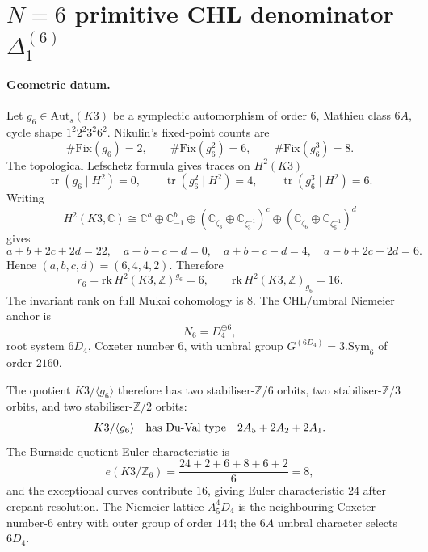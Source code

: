 \providecommand{\C}{\mathbb{C}}
\providecommand{\Z}{\mathbb{Z}}
\providecommand{\Q}{\mathbb{Q}}
\providecommand{\Sp}{\mathrm{Sp}}
\providecommand{\SO}{\mathrm{SO}}
\providecommand{\Auts}{\mathrm{Aut}_{s}}
\providecommand{\Fix}{\mathrm{Fix}}
\providecommand{\fg}{\mathfrak{g}}
\providecommand{\Bor}{\mathrm{Bor}}
\providecommand{\Grit}{\mathrm{Grit}}
\providecommand{\kch}{\kappa_{\mathrm{ch}}}
\providecommand{\kBKM}{\kappa_{\mathrm{BKM}}}
\providecommand{\kcat}{\kappa_{\mathrm{cat}}}
\providecommand{\kfib}{\kappa_{\mathrm{fiber}}}
\providecommand{\phiZO}{\phi_{0,1}}
\providecommand{\GammaSix}{\Gamma_{6}^{+}}
\providecommand{\DeltaOneSix}{\Delta_{1}^{(6)}}
\providecommand{\gSix}{\fg_{\DeltaOneSix}}

\section*{$N=6$ primitive CHL denominator $\DeltaOneSix$}
\label{sec:N6-primitive-chl-denominator}

\paragraph{Geometric datum.}
Let $g_6\in\Auts(K3)$ be a symplectic automorphism of order $6$, Mathieu
class $6A$, cycle shape $1^2 2^2 3^2 6^2$. Nikulin's fixed-point counts
are
\[
  \#\Fix(g_6)=2,\qquad
  \#\Fix(g_6^2)=6,\qquad
  \#\Fix(g_6^3)=8 .
\]
The topological Lefschetz formula gives traces on $H^2(K3)$
\[
  \operatorname{tr}(g_6\mid H^2)=0,\qquad
  \operatorname{tr}(g_6^2\mid H^2)=4,\qquad
  \operatorname{tr}(g_6^3\mid H^2)=6 .
\]
Writing
\[
  H^2(K3,\C)\cong
  \C^{a}\oplus\C_{-1}^{b}
  \oplus(\C_{\zeta_3}\oplus\C_{\zeta_3^{-1}})^c
  \oplus(\C_{\zeta_6}\oplus\C_{\zeta_6^{-1}})^d
\]
gives
\[
  a+b+2c+2d=22,\quad a-b-c+d=0,\quad
  a+b-c-d=4,\quad a-b+2c-2d=6 .
\]
Hence $(a,b,c,d)=(6,4,4,2)$. Therefore
\[
  r_6=\mathrm{rk}\,H^2(K3,\Z)^{g_6}=6,
  \qquad
  \mathrm{rk}\,H^2(K3,\Z)_{g_6}=16 .
\]
The invariant rank on full Mukai cohomology is $8$.
The CHL/umbral Niemeier anchor is
\[
  N_6=D_4^{\oplus6},
\]
root system $6D_4$, Coxeter number $6$, with umbral group
$G^{(6D_4)}=3.\mathrm{Sym}_6$ of order $2160$.

The quotient $K3/\langle g_6\rangle$ therefore has two stabiliser-$\Z/6$
orbits, two stabiliser-$\Z/3$ orbits, and two stabiliser-$\Z/2$ orbits:
\[
  K3/\langle g_6\rangle
  \quad\hbox{has Du-Val type}\quad
  2A_5+2A_2+2A_1 .
\]
The Burnside quotient Euler characteristic is
\[
  e(K3/\Z_6)=\frac{24+2+6+8+6+2}{6}=8,
\]
and the exceptional curves contribute $16$, giving Euler characteristic
$24$ after crepant resolution. The Niemeier lattice $A_5^4D_4$ is the
neighbouring Coxeter-number-$6$ entry with outer group of order $144$;
the $6A$ umbral character selects $6D_4$.

